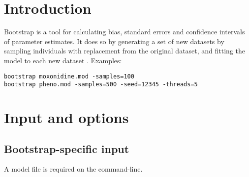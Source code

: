 


\maketitle


\section{Introduction}

Bootstrap is a tool for calculating bias, standard errors and confidence intervals of parameter estimates. It does so by generating a set of new datasets by sampling individuals with replacement from the original dataset, and fitting the model to each new dataset \cite{Efron}. 
Examples:
\begin{verbatim}
bootstrap moxonidine.mod -samples=100
bootstrap pheno.mod -samples=500 -seed=12345 -threads=5
\end{verbatim}

\section{Input and options}

\subsection{Bootstrap-specific input}
A model file is required on the command-line.

